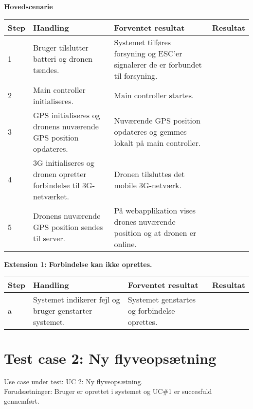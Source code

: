 \textbf{Hovedscenarie}
\begin{table}[H]
	\centering
		\begin{tabular}{|l|p{5 cm}|p{5 cm}|p{3.5 cm}|} 
		\hline
			Step & Handling & Forventet resultat & Resultat\\ \hline
			1 & Bruger tilslutter batteri og dronen tændes. & Systemet tilføres forsyning og ESC'er signalerer de er \newline forbundet til forsyning. &   \\ \hline
			2 & Main controller initialiseres. & Main controller startes. &   \\ \hline
			3 & GPS initialiseres og dronens nuværende GPS position \newline opdateres. & Nuværende GPS position \newline opdateres og gemmes lokalt på main controller. &   \\ \hline
			4 & 3G initialiseres og dronen opretter forbindelse til \newline 3G-netværket. & Dronen tilsluttes det mobile \newline 3G-netværk. &  \\ \hline
			5 & Dronens nuværende GPS \newline position sendes til server. & På webapplikation vises \newline drones nuværende position og at dronen er online. &  \\ \hline
		\end{tabular}
\end{table}

\textbf{Extension 1: Forbindelse kan ikke oprettes.}
\begin{table}[H]
	\centering
		\begin{tabular}{|l|p{5 cm}|p{5 cm}|p{3.5 cm}|} 
		\hline
			Step & Handling & Forventet resultat & Resultat\\ \hline
			a & Systemet indikerer fejl og bruger genstarter systemet. & Systemet genstartes og \newline forbindelse oprettes. & \\ \hline
		\end{tabular}
\end{table}

\newpage
\section{Test case 2: Ny flyveopsætning}
Use case under test: UC 2: Ny flyveopsætning.\\
Forudsætninger:	Bruger er oprettet i systemet og UC\#1 er succesfuld gennemført.


